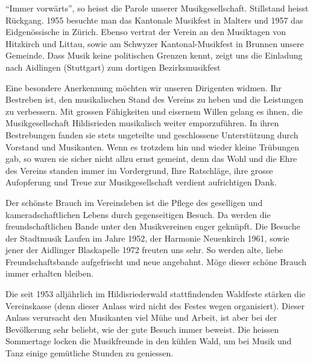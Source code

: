 \begin{multicols}{2}


    "`Immer vorwärts"', so heisst die Parole unserer Musikgesellschaft. Stillstand
    heisst Rückgang. 1955 besuchte man das Kantonale Musikfest in Malters und
    1957 das Eidgenössische in Zürich. Ebenso vertrat der Verein an den
    Musiktagen von Hitzkirch und Littau, sowie am Schwyzer Kantonal-Musikfest in
    Brunnen unsere Gemeinde. Dass Musik keine politischen Grenzen kennt, zeigt
    uns die Einladung nach Aidlingen (Stuttgart) zum dortigen Bezirksmusikfest

    Eine besondere Anerkennung möchten wir unseren Dirigenten widmen. Ihr
    Bestreben ist, den musikalischen Stand des Vereins zu heben und die
    Leistungen zu verbessern. Mit grossen Fähigkeiten und eisernem Willen gelang
    es ihnen, die Musikgesellschaft Hildisrieden musikalisch weiter
    emporzuführen. In ihren Bestrebungen fanden sie stets ungeteilte und
    geschlossene Unterstützung durch Vorstand und Musikanten. Wenn es trotzdem
    hin und wieder kleine Trübungen gab, so waren sie sicher nicht allzu ernst
    gemeint, denn das Wohl und die Ehre des Vereins standen immer im
    Vordergrund, Ihre Ratschläge, ihre grosse Aufopferung und Treue zur
    Musikgesellschaft verdient aufrichtigen Dank.

    Der schönste Brauch im Vereinsleben ist die Pflege des geselligen und
    kameradschaftlichen Lebens durch gegenseitigen Besuch. Da werden die
    freundschaftlichen Bande unter den Musikvereinen enger geknüpft. Die Besuche
    der Stadtmusik Laufen im Jahre 1952, der Harmonie Neuenkirch 1961, sowie
    jener der Aidlinger Blaskapelle 1972 freuten uns sehr. So werden alte, liebe
    Freundschaftsbande aufgefrischt und neue angebahnt. Möge dieser schöne
    Brauch immer erhalten bleiben.

    Die seit 1953 alljährlich im Hildisriederwald stattfindenden Waldfeste
    stärken die Vereinskasse (denn dieser Anlass wird nicht des Festes wegen
    organisiert). Dieser Anlass verursacht den Musikanten viel Mühe und Arbeit,
    ist aber bei der Bevölkerung sehr beliebt, wie der gute Besuch immer
    beweist. Die heissen Sommertage locken die Musikfreunde in den kühlen Wald,
    um bei Musik und Tanz einige gemütliche Stunden zu geniessen.


\end{multicols}
